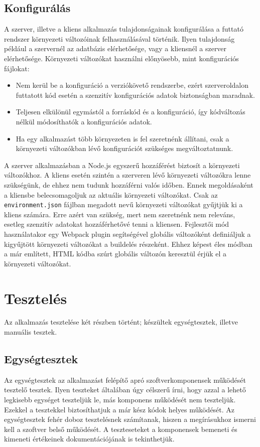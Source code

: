\documentclass{elteikthesis}
\begin{document}
			\subsection{Konfigurálás}
				A szerver, illetve a kliens alkalmazás tulajdonságainak konfigurálása a futtató rendszer környezeti változóinak felhasználásával történik. Ilyen tulajdonság például a szervernél az adatbázis elérhetősége, vagy a kliensnél a szerver elérhetősége. Környezeti változókat használni előnyösebb, mint konfigurációs fájlokat:
				\begin{itemize}
					\setlength\itemsep{-0.5em}
					\item Nem kerül be a konfiguráció a verziókövető rendszerbe, ezért szerveroldalon futtatott kód esetén a szenzitív konfigurációs adatok biztonságban maradnak.
					\item Teljesen elkülönül egymástól a forráskód és a konfiguráció, így kódváltozás nélkül módosíthatók a konfigurációs adatok.
					\item Ha egy alkalmazást több környezeten is fel szeretnénk állítani, csak a környezeti változókban lévő konfigurációt szükséges megváltoztatnunk.
				\end{itemize}

				A szerver alkalmazásban a Node.js egyszerű hozzáférést biztosít a környezeti változókhoz. A kliens esetén szintén a szerveren lévő környezeti változókra lenne szükségünk, de ehhez nem tudunk hozzáférni valós időben. Ennek megoldásaként a kliensbe belecsomagoljuk az aktuális környezeti változókat. Csak az \texttt{environment.json} fájlban megadott nevű környezeti változókat gyűjtjük ki a kliens számára. Erre azért van szükség, mert nem szeretnénk nem releváns, esetleg szenzitív adatokat hozzáférhetővé tenni a kliensen. Fejlesztői mód használatakor egy Webpack plugin segítségével globális változóként definiáljuk a kigyűjtött környezeti változókat a buildelés részeként. Ehhez képest éles módban a már említett, HTML kódba szúrt globális változón keresztül érjük el a környezeti változókat.
		
		\section{Tesztelés}
			Az alkalmazás tesztelése két részben történt; készültek egységtesztek, illetve manuális tesztek.

			\subsection{Egységtesztek}
				Az egységtesztek \cite{unittesting} az alkalmazást felépítő apró szoftverkomponensek működését tesztelő tesztek. Ilyen teszteket általában úgy célszerű írni, hogy azzal a lehető legkisebb egységet teszteljük le, más komponens működését nem teszteljük. Ezekkel a tesztekkel biztosíthatjuk a már kész kódok helyes működését. Az egységtesztek fehér doboz tesztelésnek számítanak, hiszen a megírásukhoz ismerni kell a szoftver belső működését. A teszteseteket a komponensek bemeneti és kimeneti értékeinek dokumentációjának is tekinthetjük. 
\end{document}
